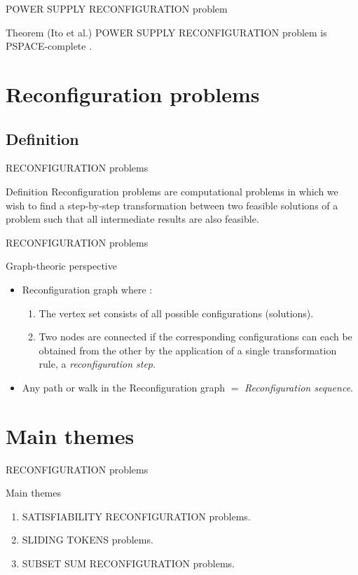 \begin{frame}{POWER SUPPLY RECONFIGURATION problem}
    \begin{block}{Theorem (Ito et al.)}
    POWER SUPPLY RECONFIGURATION problem is PSPACE-complete \cite{DBLP:journals/tcs/ItoDHPSUU11}.
    \end{block}
\end{frame}

\section{Reconfiguration problems}
\subsection{Definition}
\begin{frame}{RECONFIGURATION problems}
  \begin{block}{Definition}
    Reconﬁguration problems are computational problems in which we wish to ﬁnd a step-by-step transformation between two feasible solutions of a problem such that all intermediate results are also feasible.
  \end{block}
\end{frame}


\begin{frame}{RECONFIGURATION problems}
    \begin{block}{Graph-theoric perspective}
    \begin{itemize}
        \item Reconfiguration graph where : 
        \begin{enumerate}
            \item The vertex set consists of all possible configurations (solutions).
            \item Two nodes are connected if the corresponding conﬁgurations can each be obtained from the other by the application of a single transformation rule, a \textit{reconﬁguration step}.
        \end{enumerate}
        \item Any path or walk in the Reconﬁguration graph $=$ \textit{Reconfiguration sequence}. 
    \end{itemize}
  \end{block}
\end{frame}

\section{Main themes}
\begin{frame}{RECONFIGURATION problems}
    \begin{block}{Main themes}
        \begin{enumerate}
            \item SATISFIABILITY RECONFIGURATION problems.
            \item SLIDING TOKENS problems. 
            \item SUBSET SUM RECONFIGURATION problems.
        \end{enumerate}
    \end{block}
\end{frame}



